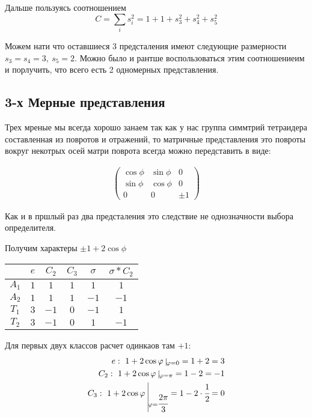 Дальше пользуясь соотношением 
\begin{equation}
    C = \sum_i s^2_i = 1 + 1 + s^2_3 + s^2_4 + s^2_5
\end{equation}

Можем нати что оставшиеся 3 предсталения имеют следующие размерности 
$s_3 = s_4 = 3, \ s_5 = 2$. Можно было и рантше воспользоваться этим 
соотношениеим и порлучить, что всего есть 2 одномерных представления.

\subsection*{3-х Мерные представления}

Трех мреные мы всегда хорошо занаем так как у нас группа симмтрий 
тетраидера составленная из повротов и отражений, то матричные представления 
это повроты вокруг некотрых осей  матри поврота всегда можно передставить 
в виде:

\begin{gather}
    \begin{pmatrix}
        \cos \phi & \sin \phi & 0 \\
        \sin \phi & \cos \phi & 0 \\
        0 & 0 & \pm 1 
    \end{pmatrix}
\end{gather}

Как и в пршлый раз два предсталения это следствие не однозначности выбора 
определителя.

Получим характеры $\pm 1 + 2 \cos \phi$

\begin{tabular}[pos]{c|c|c|c|c|c}
        & $e$   & $C_2$ & $C_3$ & $\sigma$  & $\sigma*C_2$  \\ \hline
$A_1$   & $1$   & $1$   & $1$   & $1$       & $1$           \\ \hline
$A_2$   & $1$   & $1$   & $1$   & $-1$      & $-1$          \\ \hline
$T_1$   & $3$   & $-1$  & $0$   & $-1$      & $1$           \\ \hline
$T_2$   & $3$   & $-1$  & $0$   & $1$       & $-1$          
\end{tabular}

Для первых двух классов расчет одинкаов там $+1$:
\begin{eqnarray}
    e: \ 1 + 2 \cos \phi \ \vline_{\phi = 0} = 1 + 2 = 3 \\
    C_2: \ 1 + 2 \cos \phi \ \vline_{\phi = \pi} = 1 - 2 = -1 \\
    C_3: \ 1 + 2 \cos \phi \ \vline_{\phi = \cfrac{2 \pi}{3}} = 1 - 2 \cdot \cfrac{1}{2} = 0
\end{eqnarray}

